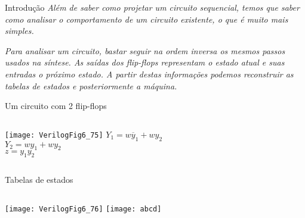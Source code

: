 

\subtitle{Análise de Circuitos Sequenciais} %



\begin{frame}
	\titlepage
\end{frame} 

\begin{frame}{Introdução} \centering
\textit{Além de saber como projetar um circuito sequencial, temos que saber como analisar o comportamento de um circuito existente, o que é muito mais simples.}

\vspace{1cm}

\textit{Para analisar um circuito, bastar seguir na ordem inversa os mesmos passos usados na síntese. As saídas dos flip-flops representam o estado atual e suas entradas o próximo estado. A partir destas informações podemos reconstruir as tabelas de estados e posteriormente a máquina.}
\end{frame}

\begin{frame}{Um circuito com 2 flip-flops} \centering
    \begin{columns}
            \texttt{[image: VerilogFig6\_75]}
            \vfill
            \pause
            $Y_1 = w\overline{y}_1 + wy_2$ \\ 
            $Y_2 = wy_1 + wy_2$ \\
            $z = y_1y_2$ \\
    \end{columns}
\end{frame}

\begin{frame}{Tabelas de estados} \centering
    \begin{columns}
            \texttt{[image: VerilogFig6\_76]}
        \pause
            \texttt{[image: abcd]}
    \end{columns}
\end{frame}

